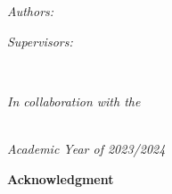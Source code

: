 \documentclass[
11pt, %
english, %
singlespacing, %
headsepline, %
]{project_structure}
\begin{document}
\begin{titlepage}
\begin{center}
\begin{minipage}[t]{0.5\textwidth}
\begin{flushleft} \large
\emph{Authors:}\\
\authorname

\end{flushleft}
\end{minipage}
\begin{minipage}[t]{0.4\textwidth}
\begin{flushright} \large
\emph{Supervisors:} \\
\supname
\end{flushright}
\end{minipage}\\[1cm]
 
\vfill

\large \textit{In collaboration with the \\ \groupname}\\[0.3cm] 
 
\vfill

\emph{Academic Year of 2023/2024}\\[4cm]
 
\vfill

\end{center}
\end{titlepage}

 \textbf{\huge Acknowledgment}
   \vspace{1cm}
 
\end{document}
